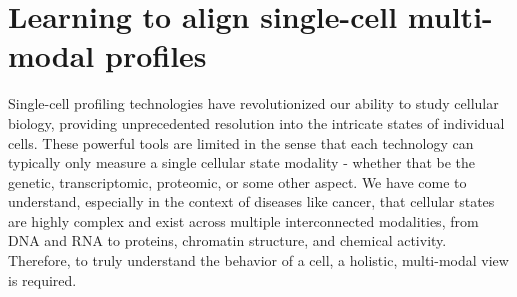 \section{Learning to align single-cell multi-modal profiles}


Single-cell profiling technologies have revolutionized our ability to study cellular biology, providing unprecedented resolution into the intricate states of individual cells.
These powerful tools are limited in the sense that each technology can typically only measure a single cellular state modality - whether that be the genetic, transcriptomic, proteomic, or some other aspect.
We have come to understand, especially in the context of diseases like cancer,
that cellular states are highly complex and exist across multiple interconnected modalities, from DNA and RNA to proteins, chromatin structure, and chemical activity. 
Therefore, to truly understand the behavior of a cell, a holistic, multi-modal view is required.



